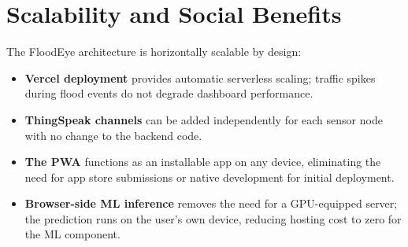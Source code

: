 \section{Scalability and Social Benefits}

The FloodEye architecture is horizontally scalable by design:

\begin{itemize}[leftmargin=1.5em]
  \item \textbf{Vercel deployment} provides automatic serverless scaling; traffic spikes during flood events do not degrade dashboard performance.
  \item \textbf{ThingSpeak channels} can be added independently for each sensor node with no change to the backend code.
  \item \textbf{The PWA} functions as an installable app on any device, eliminating the need for app store submissions or native development for initial deployment.
  \item \textbf{Browser-side ML inference} removes the need for a GPU-equipped server; the prediction runs on the user's own device, reducing hosting cost to zero for the ML component.
\end{itemize}
